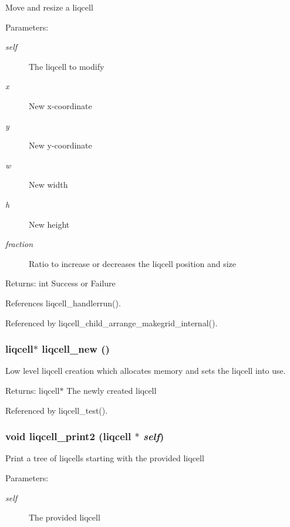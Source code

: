 Move and resize a liqcell \begin{Desc}
\item[Parameters:]
\begin{description}
\item[{\em self}]The liqcell to modify \item[{\em x}]New x-coordinate \item[{\em y}]New y-coordinate \item[{\em w}]New width \item[{\em h}]New height \item[{\em fraction}]Ratio to increase or decreases the liqcell position and size \end{description}
\end{Desc}
\begin{Desc}
\item[Returns:]int Success or Failure \end{Desc}


References liqcell\_\-handlerrun().

Referenced by liqcell\_\-child\_\-arrange\_\-makegrid\_\-internal().
\subsubsection[{liqcell\_\-new}]{\setlength{\rightskip}{0pt plus 5cm}liqcell$\ast$ liqcell\_\-new ()}\label{d5/da2/liqcell_8c_e94c5023ff9ad97c986e6d94dee1b29b}


Low level liqcell creation which allocates memory and sets the liqcell into use. \begin{Desc}
\item[Returns:]liqcell$\ast$ The newly created liqcell \end{Desc}


Referenced by liqcell\_\-test().
\subsubsection[{liqcell\_\-print2}]{\setlength{\rightskip}{0pt plus 5cm}void liqcell\_\-print2 (liqcell $\ast$ {\em self})}\label{d5/da2/liqcell_8c_85fbf221898e7ac4bdecd2de8acbf534}


Print a tree of liqcells starting with the provided liqcell \begin{Desc}
\item[Parameters:]
\begin{description}
\item[{\em self}]The provided liqcell \end{description}
\end{Desc}


